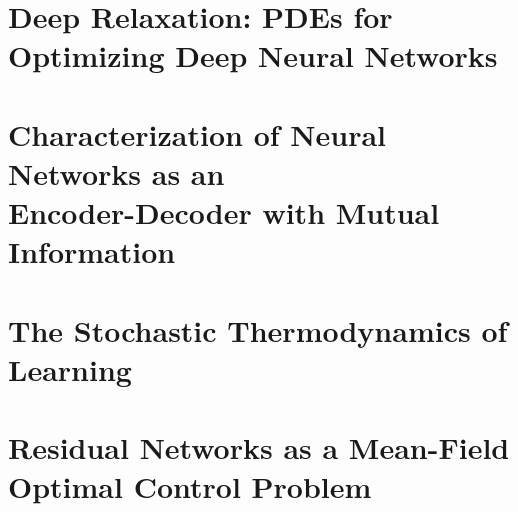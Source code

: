 \cite{blackbox} \cite{deeprelaxation} \cite{meanfield}


\section{Deep Relaxation: PDEs for Optimizing Deep Neural Networks}
\section{Characterization of Neural Networks as an \\Encoder-Decoder with Mutual Information}
\section{The Stochastic Thermodynamics of Learning}
\section{Residual Networks as a Mean-Field Optimal Control Problem}
